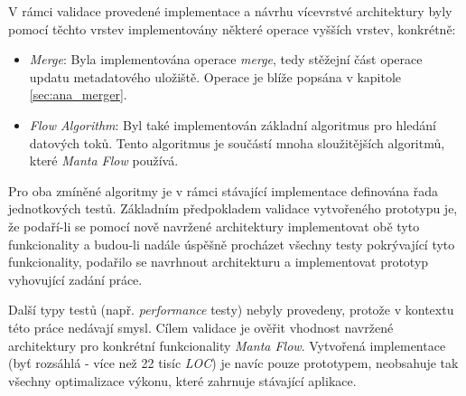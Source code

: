 V rámci validace provedené implementace a návrhu vícevrstvé architektury byly pomocí těchto vrstev implementovány některé operace vyšších vrstev, konkrétně:

\begin{itemize}
   \item{\textit{Merge}}: Byla implementována operace \textit{merge}, tedy stěžejní část operace updatu metadatového uložiště. Operace je blíže popsána v kapitole \ref{sec:ana_merger}.
   \item{\textit{Flow Algorithm}}: Byl také implementován základní algoritmus pro hledání datových toků. Tento algoritmus je součástí mnoha sloužitějších algoritmů, které \textit{Manta Flow} používá.
\end{itemize}

Pro oba zmíněné algoritmy je v rámci stávající implementace definována řada jednotkových testů. Základním předpokladem validace vytvořeného prototypu je, že podaří-li se pomocí nově navržené architektury implementovat obě tyto funkcionality a budou-li nadále úspěšně procházet všechny testy pokrývající tyto funkcionality, podařilo se navrhnout architekturu a implementovat prototyp vyhovující zadání práce.


Další typy testů (např. \textit{performance} testy) nebyly provedeny, protože v kontextu této práce nedávají smysl. Cílem validace je ověřit vhodnost navržené architektury pro konkrétní funkcionality \textit{Manta Flow}. Vytvořená implementace (byť rozsáhlá - více než 22 tisíc \textit{LOC}) je navíc pouze prototypem, neobsahuje tak všechny optimalizace výkonu, které zahrnuje stávající aplikace.
